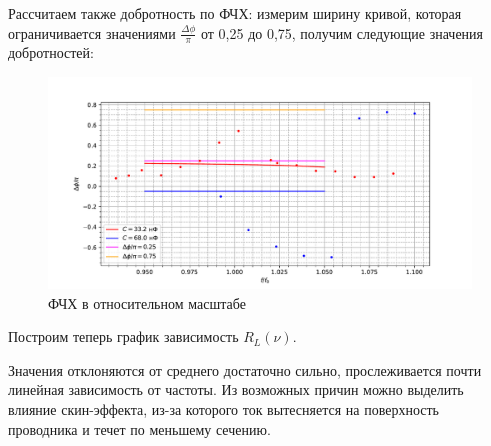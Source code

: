 \documentclass[a4paper, 12pt]{article}
\begin{document}
	Рассчитаем также добротность по ФЧХ: измерим ширину кривой, которая ограничивается значениями $\frac{\Delta \phi}{\pi}$ от 0,25 до 0,75, получим следующие значения добротностей:


	\begin{figure}[H]
		\centering
		\includegraphics[width = \textwidth]{FCH.pdf}
		\caption{ФЧХ в относительном масштабе}
	\end{figure}


	Построим теперь график зависимость $R_L(\nu)$.


	Значения отклоняются от среднего достаточно сильно, прослеживается почти линейная зависимость от частоты. Из возможных причин можно выделить влияние скин-эффекта, из-за которого ток вытесняется на поверхность проводника и течет по меньшему сечению.
\end{document}
